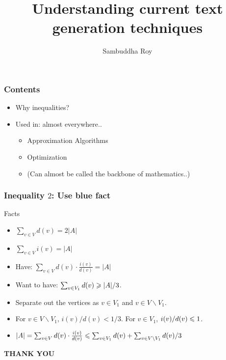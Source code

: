 \documentclass{beamer}
\title[Microsoft, March 27, 2020] %
{Understanding current text generation techniques}
\author{Sambuddha Roy}
\begin{document}
\begin{frame}
  \titlepage
\end{frame}

\begin{frame}
\frametitle{Contents}
\begin{itemize}
\item Why inequalities?
\item Used in: almost everywhere..
\pause
\begin{itemize}
\item Approximation Algorithms \pause
\item Optimization \pause
\pause
\item (Can almost be called the backbone of mathematics..)
\end{itemize}
\end{itemize}
\end{frame}



\begin{frame}
\frametitle{Inequality $2$: Use {\color{blue} blue} fact}
\begin{block}{Facts}
\begin{itemize}
\item {\color{red} $\sum_{v\in V} d(v) = 2|A|$}
\item {\color{blue} $\sum_{v \in V} i(v) = |A|$}
\end{itemize}
\end{block}
\begin{itemize}
\item Have: {\color{blue} $\sum_{v \in V} d(v)\cdot\frac{i(v)}{d(v)}
= |A|$}
\item Want to have: $\sum_{v\in V_1} d(v) \geqslant |A|/3$.
\pause
\item Separate out the vertices as $v\in V_1$ and $v\in V\backslash V_1$.
\pause
\item For $v \in V \backslash V_1$, $i(v)/d(v) < 1/3$. For $v \in V_1$, $i(v)/d(v) \leqslant 1$.
\item {\color{blue} $|A| = \sum_{v \in V} d(v)\cdot\frac{i(v)}{d(v)} \leqslant \sum_{v \in V_1} d(v) + \sum_{v\in V\backslash V_1} d(v)/3$}
\end{itemize}
\end{frame}



\begin{frame}
\begin{center}
{\bf THANK YOU}
\end{center}
\end{frame}
\end{document}
